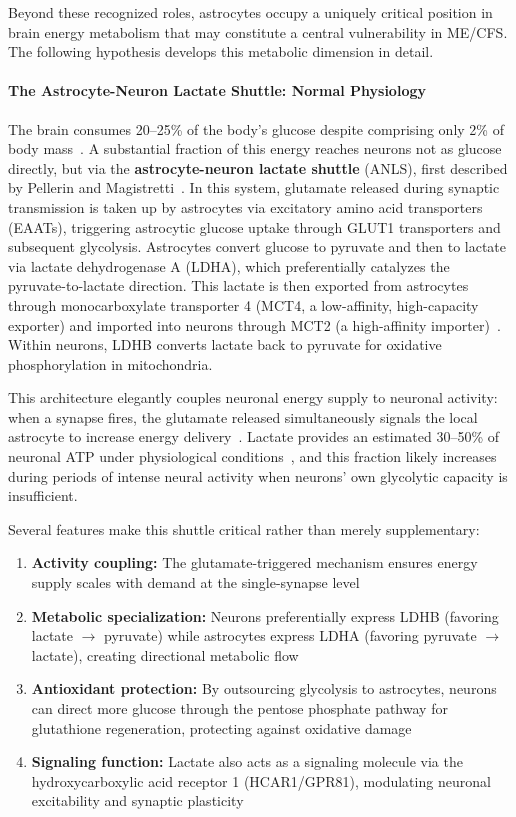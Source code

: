 Beyond these recognized roles, astrocytes occupy a uniquely critical position in brain energy metabolism that may constitute a central vulnerability in ME/CFS. The following hypothesis develops this metabolic dimension in detail.

\paragraph{The Astrocyte-Neuron Lactate Shuttle: Normal Physiology}

The brain consumes 20--25\% of the body's glucose despite comprising only 2\% of body mass~\cite{Belanger2011}. A substantial fraction of this energy reaches neurons not as glucose directly, but via the \textbf{astrocyte-neuron lactate shuttle} (ANLS), first described by Pellerin and Magistretti~\cite{Pellerin1994}. In this system, glutamate released during synaptic transmission is taken up by astrocytes via excitatory amino acid transporters (EAATs), triggering astrocytic glucose uptake through GLUT1 transporters and subsequent glycolysis. Astrocytes convert glucose to pyruvate and then to lactate via lactate dehydrogenase A (LDHA), which preferentially catalyzes the pyruvate-to-lactate direction. This lactate is then exported from astrocytes through monocarboxylate transporter 4 (MCT4, a low-affinity, high-capacity exporter) and imported into neurons through MCT2 (a high-affinity importer)~\cite{Pierre2005}. Within neurons, LDHB converts lactate back to pyruvate for oxidative phosphorylation in mitochondria.

This architecture elegantly couples neuronal energy supply to neuronal activity: when a synapse fires, the glutamate released simultaneously signals the local astrocyte to increase energy delivery~\cite{Magistretti2018}. Lactate provides an estimated 30--50\% of neuronal ATP under physiological conditions~\cite{Magistretti2018}, and this fraction likely increases during periods of intense neural activity when neurons' own glycolytic capacity is insufficient.

Several features make this shuttle critical rather than merely supplementary:

\begin{enumerate}
    \item \textbf{Activity coupling:} The glutamate-triggered mechanism ensures energy supply scales with demand at the single-synapse level
    \item \textbf{Metabolic specialization:} Neurons preferentially express LDHB (favoring lactate $\to$ pyruvate) while astrocytes express LDHA (favoring pyruvate $\to$ lactate), creating directional metabolic flow~\cite{Kim2025ANLS}
    \item \textbf{Antioxidant protection:} By outsourcing glycolysis to astrocytes, neurons can direct more glucose through the pentose phosphate pathway for glutathione regeneration, protecting against oxidative damage
    \item \textbf{Signaling function:} Lactate also acts as a signaling molecule via the hydroxycarboxylic acid receptor 1 (HCAR1/GPR81), modulating neuronal excitability and synaptic plasticity~\cite{Magistretti2018}
\end{enumerate}

